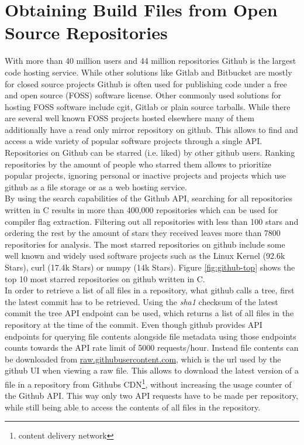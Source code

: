 \documentclass[9pt, a4paper, twocolumn]{article}
\begin{document}
\section{Obtaining Build Files from Open Source Repositories} \label{sec:github}
With more than 40 million users and 44 million repositories Github is the largest code hosting service\cite{octoverse}. While other solutions like Gitlab and Bitbucket are mostly for closed source projects Github is often used for publishing code under a free and open source (FOSS) software license. Other commonly used  solutions for hosting FOSS software include cgit, Gitlab or plain source tarballs. While there are several well known FOSS projects hosted elsewhere\cite{savannah, kernelorg} many of them additionally have a read only mirror repository on github\iffalse\cite{github-gcc, github-gnome, github-linux}\fi. This allows to find and access a wide variety of popular software projects through a single API. \\
Repositories on Github can be starred (i.e. liked) by other github users. Ranking repositories by the amount of people who starred them allows to prioritize popular projects, ignoring personal or inactive projects and projects which use github as a file storage or as a web hosting service\cite{mining-github1, mining-github2, mining-github3}. \\
By using the search capabilities of the Github API\cite{github-api}, searching for all repositories written in C results in more than 400,000 repositories which can be used for compiler flag extraction. Filtering out all repositories with less than 100 stars and ordering the rest by the amount of stars they received leaves more than 7800 repositories for analysis. The most starred repositories on github include some well known and widely used software projects such as the Linux Kernel (92.6k Stars), curl (17.4k Stars) or numpy (14k Stars). Figure \ref{fig:github-top} shows the top 10 most starred repositories on github written in C. \\
In order to retrieve a list of all files in a repository, what github calls a tree, first the latest commit has to be retrieved. Using the \textit{sha1} checksum of the latest commit the tree API endpoint can be used, which returns a list of all files in the repository at the time of the commit. Even though github provides API endpoints for querying file contents alongside file metadata using those endpoints counts towards the API rate limit of 5000 requests/hour. Instead file contents can be downloaded from \url{raw.githubusercontent.com}, which is the url used by the github UI when viewing a raw file. This allows to download the latest version of a file in a repository from Githubs CDN\footnote{content delivery network}, without increasing the usage counter of the Github API. This way only two API requests have to be made per repository, while still being able to access the contents of all files in the repository. \\
\end{document}
